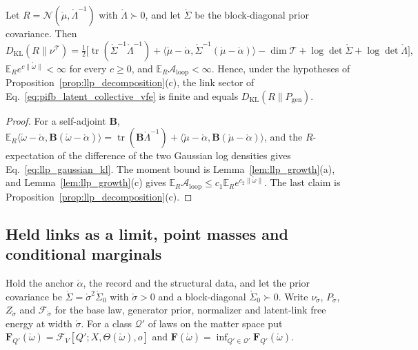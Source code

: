 \begin{proposition}\label{prop:llp_gaussian_recognition}
Let $R=\mathcal N(\mathring\mu,\mathring\Lambda^{-1})$ with $\mathring\Lambda\succ0$, and let $\mathring\Sigma$ be the block-diagonal prior covariance. Then
\begin{equation}
D_{\mathrm{KL}}(R\|\nu^{\mathcal T})=\tfrac12\bigl[\operatorname{tr}(\mathring\Sigma^{-1}\mathring\Lambda^{-1})+\langle\mathring\mu-\mathring\alpha,\mathring\Sigma^{-1}(\mathring\mu-\mathring\alpha)\rangle-\dim\mathcal T+\log\det\mathring\Sigma+\log\det\mathring\Lambda\bigr],
\label{eq:llp_gaussian_kl}
\end{equation}
$\mathbb E_Re^{c\|\mathring\omega\|}<\infty$ for every $c\geq0$, and $\mathbb E_R\mathcal A_{\mathrm{loop}}<\infty$. Hence, under the hypotheses of Proposition~\ref{prop:llp_decomposition}(c), the link sector of Eq.~\eqref{eq:pifb_latent_collective_vfe} is finite and equals $D_{\mathrm{KL}}(R\|P_{\mathrm{gen}})$.
\end{proposition}

\begin{proof}
For a self-adjoint $\mathbf B$, $\mathbb E_R\langle\mathring\omega-\mathring\alpha,\mathbf B(\mathring\omega-\mathring\alpha)\rangle=\operatorname{tr}(\mathbf B\mathring\Lambda^{-1})+\langle\mathring\mu-\mathring\alpha,\mathbf B(\mathring\mu-\mathring\alpha)\rangle$, and the $R$-expectation of the difference of the two Gaussian log densities gives Eq.~\eqref{eq:llp_gaussian_kl}. The moment bound is Lemma~\ref{lem:llp_growth}(a), and Lemma~\ref{lem:llp_growth}(c) gives $\mathbb E_R\mathcal A_{\mathrm{loop}}\leq c_1\mathbb E_Re^{c_2\|\mathring\omega\|}$. The last claim is Proposition~\ref{prop:llp_decomposition}(c).
\end{proof}

\subsection{Held links as a limit, point masses and conditional marginals}\label{app:llp_held}

Hold the anchor $\mathring\alpha$, the record and the structural data, and let the prior covariance be $\mathring\Sigma=\mathring\sigma^2\mathring\Sigma_0$ with $\mathring\sigma>0$ and a block-diagonal $\mathring\Sigma_0\succ0$. Write $\nu_{\mathring\sigma}$, $P_{\mathring\sigma}$, $Z_{\mathring\sigma}$ and $\mathcal F_{\mathring\sigma}$ for the base law, generator prior, normalizer and latent-link free energy at width $\mathring\sigma$. For a class $\mathcal Q'$ of laws on the matter space put $\mathbf F_{Q'}(\mathring\omega)=\mathcal F_V[Q';X,\Theta(\mathring\omega),o]$ and $\mathbf F(\mathring\omega)=\inf_{Q'\in\mathcal Q'}\mathbf F_{Q'}(\mathring\omega)$.

